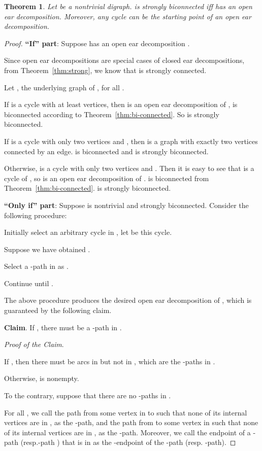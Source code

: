 \documentclass{article}
\newtheorem{thm}{Theorem}
\begin{document}
\begin{thm}\label{thm:bi-strong}
Let  be a nontrivial digraph.  is strongly biconnected iff 
has an open ear decomposition. Moreover, any cycle can be the
starting point of an open ear decomposition.
\end{thm}
\begin{proof}

\noindent \textbf{``If'' part}: Suppose  has an open ear
decomposition .

Since open ear decompositions are special cases of closed ear
decompositions, from Theorem~\ref{thm:strong}, we know that  is
strongly connected.

Let , the underlying graph of ,
for all .

If  is a cycle with at least  vertices, then
 is an open ear decomposition of
,  is biconnected according to
Theorem~\ref{thm:bi-connected}. So  is strongly biconnected.

If  is a cycle with only two vertices and , then
 is a graph with exactly two vertices connected by
an edge.  is biconnected and  is strongly
biconnected.

Otherwise,  is a cycle with only two vertices and . Then
it is easy to see that  is a cycle of
, so  is an open ear
decomposition of .  is biconnected
from Theorem~\ref{thm:bi-connected}.  is strongly biconnected.

\noindent \textbf{``Only if'' part}: Suppose  is nontrivial and
strongly biconnected. Consider the following procedure:

Initially select an arbitrary cycle in , let  be this cycle.

Suppose we have obtained .

Select a -path in  as .

Continue until .

The above procedure produces the desired open ear decomposition of
, which is guaranteed by the following claim.

\smallskip
\noindent \textbf{Claim}. If , there must be a
-path in .
\smallskip

\noindent \emph{Proof of the Claim}.

If , then there must be arcs in  but not in ,
which are the -paths in .

Otherwise,  is nonempty.

To the contrary, suppose that there are no -paths in .

For all , we call the path from some
vertex in  to  such that none of its internal vertices are
in , as the -path, and the path from  to some
vertex in  such that none of its internal vertices are in
, as the -path. Moreover, we call the endpoint of a
-path (resp.-path ) that is in  as the
-endpoint of the -path (resp. -path).


\end{proof}
\end{document}
